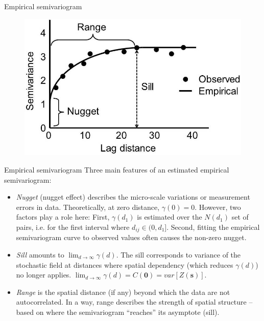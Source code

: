 \documentclass{beamer}
\begin{document}
\begin{frame}{Empirical semivariogram}
\begin{figure}
	\includegraphics[width=.9\textwidth]{IMG/sp_svgm.jpg}
\end{figure}
\end{frame}
\begin{frame}{Empirical semivariogram}
Three main features of an estimated empirical semivariogram: 
\begin{itemize}
\item \textit{Nugget} (nugget effect) describes the micro-scale variations or measurement errors in data. Theoretically, at zero distance, $\gamma(0)=0$. However, two factors play a role here: First, $\gamma(d_1)$ is estimated over the $N(d_1)$ set of pairs, i.e. for the first interval where $ d_{ij} \in (0, d_1 ]$. Second, fitting the empirical semivariogram curve to observed values often causes the non-zero nugget.
\smallskip
\item \textit{Sill} amounts to $\lim_{d \to \infty} \gamma(d)$. The sill corresponds to variance of the stochastic field at distances where spatial dependency (which reduces $\gamma(d)$) no longer applies. $\lim_{d \to \infty} \gamma(d) = C(\bm{0}) = \textit{var}[Z(\bm{s})]$.
\smallskip
\item \textit{Range} is the spatial distance (if any) beyond which the data are not autocorrelated. In a way, range describes the strength of spatial structure -- based on where the semivariogram ``reaches'' its asymptote (sill).
\end{itemize}
\end{frame}
\end{document}
